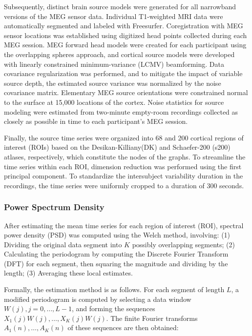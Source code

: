 \documentclass{cys}
\begin{document}
\bigskip
Subsequently, distinct brain source models were generated for all narrowband versions of the MEG sensor data. Individual T1-weighted MRI data were automatically segmented and labeled with Freesurfer. Coregistration with MEG sensor locations was established using digitized head points collected during each MEG session. MEG forward head models were created for each participant using the overlapping spheres approach, and cortical source models were developed with linearly constrained minimum-variance (LCMV) beamforming. Data covariance regularization was performed, and to mitigate the impact of variable source depth, the estimated source variance was normalized by the noise covariance matrix. Elementary MEG source orientations were constrained normal to the surface at 15,000 locations of the cortex. Noise statistics for source modeling were estimated from two-minute empty-room recordings collected as closely as possible in time to each participant’s MEG session.

\bigskip
Finally, the source time series were organized into 68 and 200 cortical regions of interest (ROIs) based on the Desikan-Killiany(DK) and Schaefer-200 (s200) atlases, respectively, which constitute the nodes of the graphs. To streamline the time series within each ROI, dimension reduction was performed using the first principal component. To standardize the intersubject variability duration in the recordings, the time series were uniformly cropped to a duration of 300 seconds.


\subsubsection{Power Spectrum Density}
\smallskip
\noindent After estimating the mean time series for each region of interest (ROI), spectral power density (PSD) was computed using the Welch method, involving: (1) Dividing the original data segment into $K$ possibly overlapping segments; (2) Calculating the periodogram by computing the Discrete Fourier Transform (DFT) for each segment, then squaring the magnitude and dividing by the length; (3) Averaging these local estimates.

\bigskip
Formally, the estimation method is as follows. For each segment of length $L$, a modified periodogram is computed by selecting a data window $W(j), j = 0,\ldots , L-1$, and forming the sequences $X_1(j)W(j),\ldots , X_K(j)W(j)$. The finite Fourier transforms $A_1(n),\ldots , A_K(n)$ of these sequences are then obtained:
\end{document}
